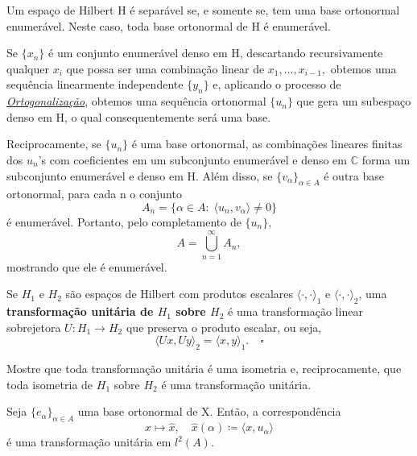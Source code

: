 \documentclass[../functional_analysis.tex]{subfiles}
\begin{document}
    \begin{theorem*}
      Um espaço de Hilbert H é separável se, e somente se, tem uma base ortonormal enumerável. Neste caso, toda base ortonormal de H é enumerável. 
    \end{theorem*}
   \begin{proof*}
     Se \(\{x_{n}\}\) é um conjunto enumerável denso em H, descartando recursivamente qualquer \(x_{i}\) que possa ser uma combinação linear de \(x_1,\dotsc ,x_{i-1},\) obtemos uma sequência linearmente independente \(\{y_{n}\}\) e, aplicando o processo de \hyperlink{gram_schmidt}{\textit{Ortogonalização}}, obtemos uma sequência ortonormal \(\{u_{n}\}\) que gera um subespaço denso em H, o qual consequentemente será uma base.

     Reciprocamente, se \(\{u_{n}\}\) é uma base ortonormal, as combinações lineares finitas dos \(u_{n}\)'s com coeficientes em um subconjunto enumerável e denso em \(\mathbb{C}\) forma um subconjunto enumerável e denso em H. Além disso, se \(\{v_{\alpha }\}_{\alpha \in A}\) é outra base ortonormal, para cada n o conjunto 
       \[
         A_{n}=\{\alpha \in A:\; \langle u_{n}, v_{\alpha } \rangle\neq 0\}
       \]
       é enumerável. Portanto, pelo completamento de \(\{u_{n}\}\), 
         \[
           A = \bigcup_{n=1}^{\infty}A_{n},
         \]
         mostrando que ele é enumerável. \qedsymbol
   \end{proof*}
   \begin{def*}
     Se \(H_1\) e \(H_2\) são espaços de Hilbert com produtos escalares \(\langle \cdot , \cdot  \rangle_1\) e \(\langle \cdot , \cdot  \rangle_2\), uma \textbf{transformação unitária de \(H_1\) sobre \(H_2\)} é uma transformação linear sobrejetora \(U:H_1\rightarrow H_2\) que preserva o produto escalar, ou seja, 
       \[
         \langle Ux, Uy \rangle_2 = \langle x, y \rangle_1. \quad \square
       \]
   \end{def*}
  \begin{exr}
    Mostre que toda transformação unitária é uma isometria e, reciprocamente, que toda isometria de \(H_1\) sobre \(H_2\) é uma transformação unitária.
  \end{exr}
  \begin{prop*}
    Seja \(\{e_{\alpha }\}_{\alpha \in A}\) uma base ortonormal de X. Então, a correspondência 
      \[
        x\mapsto \hat{x},\quad \hat{x}(\alpha )\coloneqq \langle x, u_{\alpha } \rangle
      \]
      é uma transformação unitária em \(l^{2}(A).\)
  \end{prop*}
\end{document}
